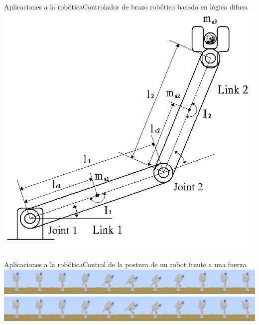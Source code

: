 \documentclass{beamer}
\begin{document}
\begin{frame}{Aplicaciones a la robótica}{Controlador de brazo robótico basado
en lógica difusa}
	\centering
	\includegraphics[scale=0.3]{arm}
\end{frame}
\begin{frame}{Aplicaciones a la robótica}{Control de la postura de un robot
frente a una fuerza}
	\centering
	\includegraphics[width=\textwidth]{humanoid1}
\\
	\includegraphics[width=\textwidth]{humanoid2}
\end{frame}
\end{document}
